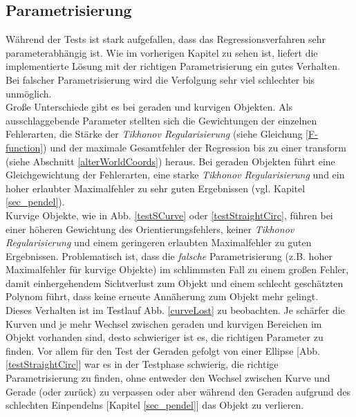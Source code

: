 \subsection{Parametrisierung}
\label{sec_param}
Während der Tests ist stark aufgefallen, dass das Regressionsverfahren sehr parameterabhängig ist. Wie im vorherigen Kapitel zu sehen ist, liefert die implementierte Lösung mit der richtigen Parametrisierung ein gutes Verhalten. 
Bei falscher Parametrisierung wird die Verfolgung sehr viel schlechter bis unmöglich.\\
Große Unterschiede gibt es bei geraden und kurvigen Objekten. Als ausschlaggebende Parameter stellten sich die Gewichtungen der einzelnen Fehlerarten, die Stärke der \textit{Tikhonov Regularisierung} (siehe Gleichung \ref{F-function}) und der maximale Gesamtfehler der Regression bis zu einer \gls{transform} (siehe Abschnitt \ref{alterWorldCoords}) heraus.
Bei geraden Objekten führt eine Gleichgewichtung der Fehlerarten, eine starke \textit{Tikhonov Regularisierung} und ein hoher erlaubter Maximalfehler zu sehr guten Ergebnissen (vgl. Kapitel \ref{sec_pendel}).\\
Kurvige Objekte, wie in Abb. \ref{testSCurve} oder \ref{testStraightCirc}, führen bei einer höheren Gewichtung des Orientierungsfehlers, keiner \textit{Tikhonov Regularisierung} und einem geringeren erlaubten Maximalfehler zu guten Ergebnissen.
Problematisch ist, dass die \textit{falsche} Parametrisierung (z.B. hoher Maximalfehler für kurvige Objekte) im schlimmsten Fall zu einem großen Fehler, damit einhergehendem Sichtverlust zum Objekt und einem schlecht geschätzten Polynom führt, dass keine erneute Annäherung zum Objekt mehr gelingt. \\
Dieses Verhalten ist im Testlauf Abb. \ref{curveLost} zu beobachten. Je schärfer die Kurven und je mehr Wechsel zwischen geraden und kurvigen Bereichen im Objekt vorhanden sind, desto schwieriger ist es, die richtigen Parameter zu finden. Vor allem für den Test der Geraden gefolgt von einer Ellipse [Abb. \ref{testStraightCirc}] war es in der Testphase schwierig, die richtige Parametrisierung zu finden, ohne entweder den Wechsel zwischen Kurve und Gerade (oder zurück) zu verpassen oder aber während den Geraden aufgrund des schlechten Einpendelns [Kapitel \ref{sec_pendel}] das Objekt zu verlieren.

